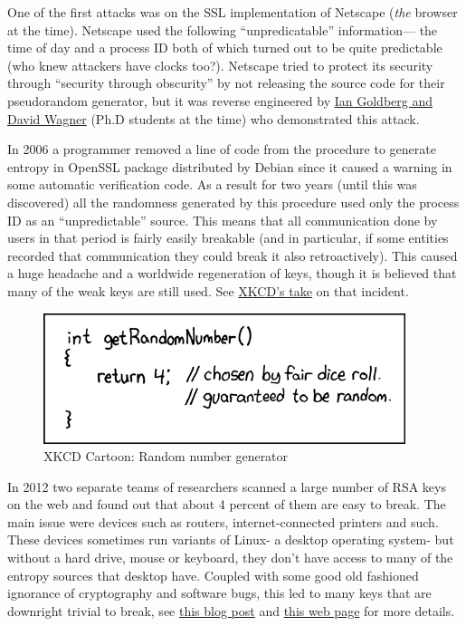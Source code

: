 One of the first attacks was on the SSL implementation of Netscape
(\emph{the} browser at the time). Netscape used the following
``unpredicatable'' information--- the time of day and a process ID both
of which turned out to be quite predictable (who knew attackers have
clocks too?). Netscape tried to protect its security through ``security
through obscurity'' by not releasing the source code for their
pseudorandom generator, but it was reverse engineered by
\href{https://www.cs.berkeley.edu/~daw/papers/ddj-netscape.html}{Ian
Goldberg and David Wagner} (Ph.D students at the time) who demonstrated
this attack.

In 2006 a programmer removed a line of code from the procedure to
generate entropy in OpenSSL package distributed by Debian since it
caused a warning in some automatic verification code. As a result for
two years (until this was discovered) all the randomness generated by
this procedure used only the process ID as an ``unpredictable'' source.
This means that all communication done by users in that period is fairly
easily breakable (and in particular, if some entities recorded that
communication they could break it also retroactively). This caused a
huge headache and a worldwide regeneration of keys, though it is
believed that many of the weak keys are still used. See
\href{http://www.xkcd.com/424/}{XKCD's take} on that incident.

\begin{figure}
\centering
\includegraphics[width=\textwidth, height=0.25\paperheight, keepaspectratio]{../figure/random_number.png}
\caption{XKCD Cartoon: Random number generator}
\label{tmplabelfig}
\end{figure}

In 2012 two separate teams of researchers scanned a large number of RSA
keys on the web and found out that about 4 percent of them are easy to
break. The main issue were devices such as routers, internet-connected
printers and such. These devices sometimes run variants of Linux- a
desktop operating system- but without a hard drive, mouse or keyboard,
they don't have access to many of the entropy sources that desktop have.
Coupled with some good old fashioned ignorance of cryptography and
software bugs, this led to many keys that are downright trivial to
break, see
\href{https://freedom-to-tinker.com/blog/nadiah/new-research-theres-no-need-panic-over-factorable-keys-just-mind-your-ps-and-qs/}{this
blog post} and \href{https://factorable.net/}{this web page} for more
details.

